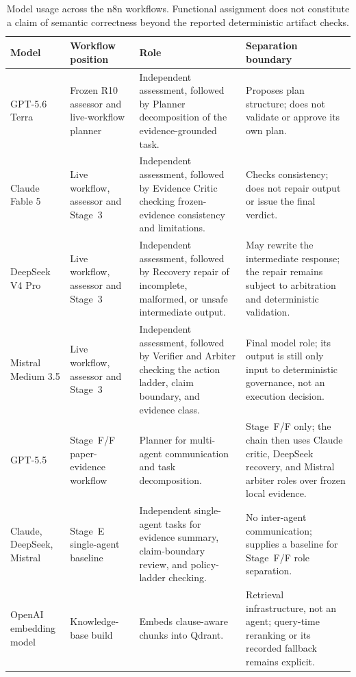 \documentclass[journal]{IEEEtran}
\begin{document}
\begin{table}[!t]
\centering
\caption{Model usage across the n8n workflows. Functional assignment does not
constitute a claim of semantic correctness beyond the reported deterministic
artifact checks.}
\label{tab:llm-roles}
\begin{adjustbox}{width=\textwidth}
\begin{tabular}{L{2.8cm}L{3.5cm}L{5.4cm}L{6.0cm}}
\toprule
Model & Workflow position & Role & Separation boundary \\
\midrule
GPT-5.6 Terra & Frozen R10 assessor and live-workflow planner &
Independent assessment, followed by Planner decomposition of the
evidence-grounded task. &
Proposes plan structure; does not validate or approve its own plan. \\
Claude Fable 5 & Live workflow, assessor and Stage~3 &
Independent assessment, followed by Evidence Critic checking frozen-evidence
consistency and limitations. &
Checks consistency; does not repair output or issue the final verdict. \\
DeepSeek V4 Pro & Live workflow, assessor and Stage~3 &
Independent assessment, followed by Recovery repair of incomplete, malformed,
or unsafe intermediate output. &
May rewrite the intermediate response; the repair remains subject to
arbitration and deterministic validation. \\
Mistral Medium 3.5 & Live workflow, assessor and Stage~3 &
Independent assessment, followed by Verifier and Arbiter checking the action
ladder, claim boundary, and evidence class. &
Final model role; its output is still only input to deterministic governance,
not an execution decision. \\
GPT-5.5 & Stage~F/F paper-evidence workflow &
Planner for multi-agent communication and task decomposition. &
Stage~F/F only; the chain then uses Claude critic, DeepSeek recovery, and
Mistral arbiter roles over frozen local evidence. \\
Claude, DeepSeek, Mistral & Stage~E single-agent baseline &
Independent single-agent tasks for evidence summary, claim-boundary review,
and policy-ladder checking. &
No inter-agent communication; supplies a baseline for Stage~F/F role
separation. \\
OpenAI embedding model & Knowledge-base build &
Embeds clause-aware chunks into Qdrant. &
Retrieval infrastructure, not an agent; query-time reranking or its recorded
fallback remains explicit. \\
\bottomrule
\end{tabular}
\end{adjustbox}
\end{table}
\end{document}
